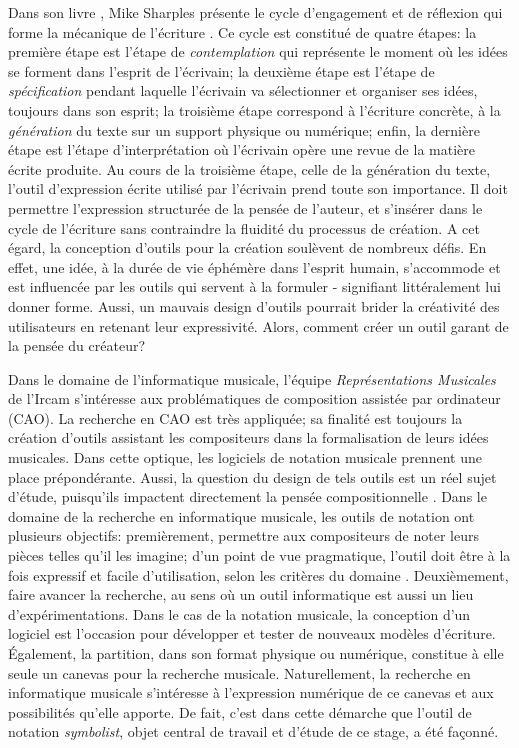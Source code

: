 Dans son livre , Mike Sharples présente le \og cycle d'engagement et de réflexion qui forme la mécanique de l'écriture \fg. Ce cycle est constitué de quatre étapes: la première étape est l'étape de \textit{contemplation} qui représente le moment où les idées se forment dans l'esprit de l'écrivain; la deuxième étape est l'étape de \textit{spécification} pendant laquelle l'écrivain va sélectionner et organiser ses idées, toujours dans son esprit; la troisième étape correspond à l'écriture concrète, à la \textit{génération} du texte sur un support physique ou numérique; enfin, la dernière étape est l'étape d'interprétation où l'écrivain opère une revue de la matière écrite produite. Au cours de la troisième étape, celle de la génération du texte, l'outil d'expression écrite utilisé par l'écrivain prend toute son importance. Il doit permettre l'expression structurée de la pensée de l'auteur, et s'insérer dans le cycle de l'écriture sans contraindre la fluidité du processus de création. A cet égard, la conception d'outils pour la \og création \fg soulèvent de nombreux défis. En effet, une idée, à la durée de vie éphémère dans l'esprit humain, s'accommode et est influencée par les outils qui servent à la formuler - signifiant littéralement lui donner forme. Aussi, un \og mauvais \fg design d'outils pourrait brider la créativité des utilisateurs en retenant leur expressivité. Alors, comment créer un outil garant de la pensée du créateur?  

Dans le domaine de l'informatique musicale, l'équipe \textit{Représentations Musicales} de l'Ircam s'intéresse aux problématiques de composition assistée par ordinateur (CAO). La recherche en CAO est très appliquée; sa finalité est toujours la création d'outils assistant les compositeurs dans la formalisation de leurs idées musicales. Dans cette optique, les logiciels de notation musicale prennent une place prépondérante. Aussi, la question du design de tels outils est un réel sujet d'étude, puisqu'ils impactent directement la pensée compositionnelle \cite{fober2015}. Dans le domaine de la recherche en informatique musicale, les outils de notation ont plusieurs objectifs: premièrement, permettre aux compositeurs de noter leurs pièces telles qu'il les imagine; d'un point de vue pragmatique, l'outil doit être à la fois expressif et facile d'utilisation, selon les critères du domaine \cite{nash2015}. Deuxièmement, faire avancer la recherche, au sens où un outil informatique est aussi un lieu d'expérimentations. Dans le cas de la notation musicale, la conception d'un logiciel est l'occasion pour développer et tester de nouveaux modèles d'écriture. Également, la partition, dans son format physique ou numérique, constitue à elle seule un canevas pour la recherche musicale. Naturellement, la recherche en \og informatique musicale \fg s'intéresse à l'expression numérique de ce canevas et aux possibilités qu'elle apporte.
De fait, c'est dans cette démarche que l'outil de notation \textit{symbolist}, objet central de travail et d'étude de ce stage, a été façonné.


